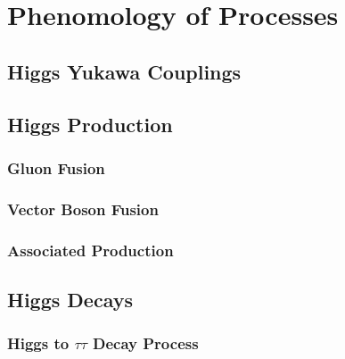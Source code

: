 \chapter{Phenomology of Processes}

\section{Higgs Yukawa Couplings}

\section{Higgs Production}

\subsection{Gluon Fusion}

\subsection{Vector Boson Fusion}

\subsection{Associated Production}

\section{Higgs Decays}

\subsection{Higgs to $\tau\tau$ Decay Process}

